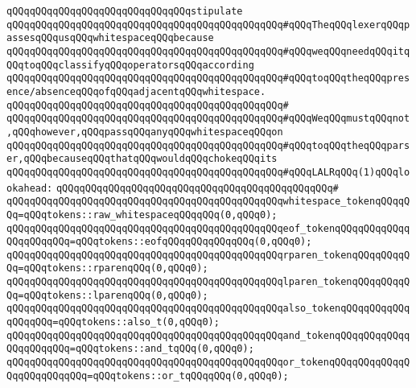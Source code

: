 \newline
\verb|qQQqqQQqqQQqqQQqqQQqqQQqqQQqqQQqstipulate|\newline
\newline
\verb|qQQqqQQqqQQqqQQqqQQqqQQqqQQqqQQqqQQqqQQqqQQqqQQq#qQQqTheqQQqlexerqQQqpassesqQQqusqQQqwhitespaceqQQqbecause|\newline
\verb|qQQqqQQqqQQqqQQqqQQqqQQqqQQqqQQqqQQqqQQqqQQqqQQq#qQQqweqQQqneedqQQqitqQQqtoqQQqclassifyqQQqoperatorsqQQqaccording|\newline
\verb|qQQqqQQqqQQqqQQqqQQqqQQqqQQqqQQqqQQqqQQqqQQqqQQq#qQQqtoqQQqtheqQQqpresence/absenceqQQqofqQQqadjacentqQQqwhitespace.|\newline
\verb|qQQqqQQqqQQqqQQqqQQqqQQqqQQqqQQqqQQqqQQqqQQqqQQq#|\newline
\verb|qQQqqQQqqQQqqQQqqQQqqQQqqQQqqQQqqQQqqQQqqQQqqQQq#qQQqWeqQQqmustqQQqnot,qQQqhowever,qQQqpassqQQqanyqQQqwhitespaceqQQqon|\newline
\verb|qQQqqQQqqQQqqQQqqQQqqQQqqQQqqQQqqQQqqQQqqQQqqQQq#qQQqtoqQQqtheqQQqparser,qQQqbecauseqQQqthatqQQqwouldqQQqchokeqQQqits|\newline
\verb|qQQqqQQqqQQqqQQqqQQqqQQqqQQqqQQqqQQqqQQqqQQqqQQq#qQQqLALRqQQq(1)qQQqlookahead:|\newline
\verb|qQQqqQQqqQQqqQQqqQQqqQQqqQQqqQQqqQQqqQQqqQQqqQQq#|\newline
\verb|qQQqqQQqqQQqqQQqqQQqqQQqqQQqqQQqqQQqqQQqqQQqqQQqwhitespace_tokenqQQqqQQq=qQQqtokens::raw_whitespaceqQQqqQQq(0,qQQq0);|\newline
\newline
\verb|qQQqqQQqqQQqqQQqqQQqqQQqqQQqqQQqqQQqqQQqqQQqqQQqeof_tokenqQQqqQQqqQQqqQQqqQQqqQQq=qQQqtokens::eofqQQqqQQqqQQqqQQq(0,qQQq0);|\newline
\newline
\verb|qQQqqQQqqQQqqQQqqQQqqQQqqQQqqQQqqQQqqQQqqQQqqQQqrparen_tokenqQQqqQQqqQQq=qQQqtokens::rparenqQQq(0,qQQq0);|\newline
\verb|qQQqqQQqqQQqqQQqqQQqqQQqqQQqqQQqqQQqqQQqqQQqqQQqlparen_tokenqQQqqQQqqQQq=qQQqtokens::lparenqQQq(0,qQQq0);|\newline
\newline
\newline
\verb|qQQqqQQqqQQqqQQqqQQqqQQqqQQqqQQqqQQqqQQqqQQqqQQqalso_tokenqQQqqQQqqQQqqQQqqQQq=qQQqtokens::also_t(0,qQQq0);|\newline
\verb|qQQqqQQqqQQqqQQqqQQqqQQqqQQqqQQqqQQqqQQqqQQqqQQqand_tokenqQQqqQQqqQQqqQQqqQQqqQQq=qQQqtokens::and_tqQQq(0,qQQq0);|\newline
\verb|qQQqqQQqqQQqqQQqqQQqqQQqqQQqqQQqqQQqqQQqqQQqqQQqor_tokenqQQqqQQqqQQqqQQqqQQqqQQqqQQq=qQQqtokens::or_tqQQqqQQq(0,qQQq0);|\newline
